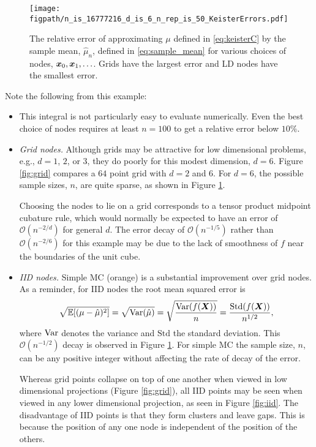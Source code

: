 \documentclass{svproc}
\newcommand{\figpath}{Figures}
\begin{document}
\begin{figure}
	\centering
	\texttt{[image: \\figpath/n\_is\_16777216\_d\_is\_6\_n\_rep\_is\_50\_KeisterErrors.pdf]}
	\caption{The relative error of approximating $\mu$ defined in \eqref{eq:keisterC} by the sample mean, $\hat{\mu}_n$, defined in \eqref{eq:sample_mean} for various choices of nodes, ${\boldsymbol{x}}_0, {\boldsymbol{x}}_1, \ldots$.  Grids have the largest error and LD nodes have the smallest error. \label{fig:keister-err}}
\end{figure}

Note the following from this example:
\begin{itemize}
	\item This integral is not particularly easy to evaluate numerically.  Even the best choice of nodes requires at least $n=100$ to get a relative error below $10\%$.

	\item \emph{Grid nodes.} Although grids may be attractive for low dimensional problems, e.g., $d = 1$, $2$, or $3$, they do poorly for this modest dimension, $d=6$.  Figure \ref{fig:grid} compares a $64$ point grid with $d = 2$ and $6$.  For $d = 6$, the possible sample sizes, $n$, are quite sparse, as shown in Figure \ref{fig:keister-err}.

	Choosing the nodes to lie on a grid corresponds to a tensor product midpoint cubature rule, which would normally be expected to have an error of $\mathcal{O}(n^{-2/d})$  for general $d$.  The error decay of $\mathcal{O}(n^{-1/5})$ rather than $\mathcal{O}(n^{-2/6})$ for this example may be due to the lack of smoothness of $f$ near the boundaries of the unit cube.

	\item \emph{IID nodes.}  Simple MC (orange) is a substantial improvement over grid nodes. As a reminder, for IID nodes the root mean squared error is
	\begin{equation}\label{eq:IIDerror}
		\sqrt{\mathbb{E}[(\mu - \hat{\mu})^2]} = \sqrt{\operatorname{Var}(\hat{\mu})} = \sqrt{\frac{\operatorname{Var}(f({\boldsymbol{X}}))}{n}} = \frac{\mathrm{Std}(f({\boldsymbol{X}}))}{n^{1/2}},
	\end{equation}
	where $\operatorname{Var}$ denotes the variance and $\mathrm{Std}$ the standard deviation.  This $\mathcal{O}(n^{-1/2})$ decay is observed in Figure \ref{fig:keister-err}. For simple MC the sample size, $n$, can be any positive integer without affecting the rate of decay of the error.

	Whereas grid points collapse on top of one another when viewed in low dimensional projections (Figure \ref{fig:grid}), all IID points may be seen when viewed in any lower dimensional projection, as seen in Figure \ref{fig:iid}.  The disadvantage of IID points is that they form clusters and leave gaps.  This is because the position of any one node is independent of the position of the others.


\end{itemize}
\end{document}
